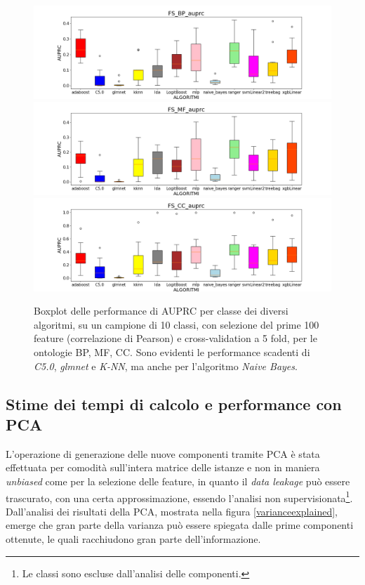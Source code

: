 \documentclass[12pt]{report}
\begin{document}
\begin{figure}[hp!]
\centering
\includegraphics[scale=0.37]{./images/FS_BP_auprc.png}
\includegraphics[scale=0.37]{./images/FS_MF_auprc.png}
\includegraphics[scale=0.37]{./images/FS_CC_auprc.png}
\caption{\footnotesize{Boxplot delle performance di AUPRC per classe dei diversi algoritmi, su un campione di 10 classi, con selezione del prime 100 feature (correlazione di Pearson) e cross-validation a 5 fold, per le ontologie BP, MF, CC. Sono evidenti le performance scadenti di \emph{C5.0}, \emph{glmnet} e \emph{K-NN}, ma anche per l'algoritmo \emph{Naive Bayes}.}}
\label{BPMFCCboxplotfs5fauprc}
\end{figure}
\newpage
\subsection{Stime dei tempi di calcolo e performance con PCA}
L'operazione di generazione delle nuove componenti tramite PCA è stata effettuata per comodità sull'intera matrice delle istanze e non in maniera \emph{unbiased} come per la selezione delle feature, in quanto il \emph{data leakage} può essere trascurato, con una certa approssimazione, essendo l'analisi non supervisionata\footnote{Le classi sono escluse dall'analisi delle componenti.}. Dall'analisi dei risultati della PCA, mostrata nella figura \ref{varianceexplained}, emerge che gran parte della varianza può essere spiegata dalle prime componenti ottenute, le quali racchiudono gran parte dell'informazione.
\end{document}
